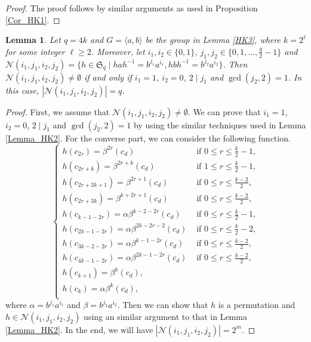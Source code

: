 \documentclass[11pt]{amsart}
\theoremstyle{plain}
\newtheorem{lem}[thm]{Lemma}
\numberwithin{equation}{section}
\begin{document}
\begin{proof}
The proof follows by similar arguments as used in Proposition \ref{Cor_HK1}.
  \end{proof}
\begin{lem}
Let $q=4k$ and $G =\langle a,b \rangle$ be the group in Lemma \ref{HK3}, where $k=2^{\ell}$ for some integer $\ell \geq 2$. Moreover, let $i_1,i_2 \in \{0,1\}$, $j_1, j_2 \in \{0,1,\ldots, \frac{q}{2}-1\}$ and $\mathcal{N}(i_1,j_1,i_2,j_2)=\{h \in \mathfrak{S}_q \mid hah^{-1}=b^{j_1}a^{i_1}, hbh^{-1}=b^{j_2}a^{i_2}\}$. Then  $\mathcal{N}(i_1,j_1,i_2,j_2) \neq \emptyset$ if and only if $i_1=1$, $i_2=0$, $2\mid j_1$ and $\gcd(j_2,2)=1$. In this case, $|\mathcal{N}(i_1,j_1,i_2,j_2)|=q$.
\end{lem}
\begin{proof}
First, we assume that $\mathcal{N}(i_1,j_1,i_2,j_2) \neq \emptyset$. We can prove that $i_1=1$, $i_2=0$, $2\mid j_1$ and $\gcd(j_2,2)=1$ by using the similar techniques used in Lemma \ref{Lemma_HK2}. For the converse part, we can consider the following function.
\[
    \begin{cases}
       h(c_{2r})= \beta^{2r}(c_{d})& \text{ if } 0 \leq r \leq \frac{k}{2}-1,  \\
       h(c_{2r+k})= \beta^{2r+k}(c_{d})& \text{ if } 1 \leq r \leq \frac{k}{2}-1,  \\
       h(c_{2r+2k+1})= \beta^{2r+1}(c_d)& \text{ if } 0 \leq r \leq \frac{k-2}{2}, \\
       h(c_{2r+3k})= \beta^{k+2r+1}(c_{d})&  \text{ if }  0  \leq r \leq \frac{k-2}{2}, \\
       h(c_{k-1-2r})= \alpha \beta^{k-2-2r} (c_{d})&  \text{ if }  0 \leq r \leq \frac{k}{2}-1,\\
       h(c_{2k-1-2r})= \alpha \beta^{2k-2r-2} (c_{d})&  \text{ if }  0 \leq r \leq \frac{k}{2}-2,\\
       h(c_{3k-2-2r})= \alpha \beta^{k-1-2r}(c_d)& \text{ if } 0 \leq r \leq \frac{k-2}{2}, \\
        h(c_{4k-1-2r})= \alpha \beta^{2k-1-2r}(c_{d})&  \text{ if }  0  \leq r \leq \frac{k-2}{2}, \\
        h(c_{k+1})= \beta^{k}(c_{d}),\\
        h(c_{k})= \alpha \beta^{k}(c_{d}),\\ 
	\end{cases}
\]
where $\alpha=b^{j_1}a^{i_1}$ and $\beta=b^{j_2}a^{i_2}$.
 Then we can show that $h$ is a permutation and $h \in \mathcal{N}(i_1,j_1,i_2,j_2)$ using an similar argument to that in Lemma \ref{Lemma_HK2}. In the end, we will have $|\mathcal{N}(i_1,j_1,i_2,j_2)|=2^m$.
\end{proof}
\end{document}
